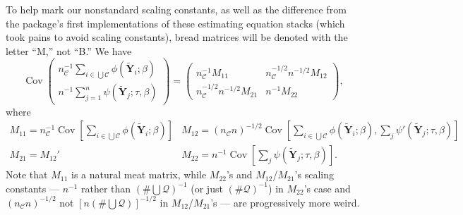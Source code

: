 \documentclass{article}
\begin{document}
To help mark our nonstandard scaling constants, as well as the difference from the package's first implementations of these estimating equation stacks (which took pains to avoid scaling constants), 
bread matrices will be denoted with the letter ``M,'' not ``B.''
We have
\[
\operatorname{Cov}\left(
     \begin{array}{c}
       n_{\mathcal{C}}^{-1}\sum_{i\in \bigcup \mathcal{C}}\phi(\tilde{\mathbf{Y}}_{i}; \beta )\\
       n^{-1}\sum_{j=1}^{n}\psi(\tilde{\mathbf{Y}}_{j}; \tau, \beta )
     \end{array}
\right) = \left(
  \begin{array}{cc}
    n_{\mathcal{C}}^{-1}M_{11}& n_{\mathcal{C}}^{-1/2}n^{-1/2} M_{12}\\
    n_{\mathcal{C}}^{-1/2}n^{-1/2} M_{21} & n^{-1}M_{22}
  \end{array}
\right),
\]
where
\[
  \begin{array}{cc}
    M_{11}  = n_{\mathcal{C}}^{-1}\operatorname{Cov}[\sum_{i\in \bigcup
             \mathcal{C}} \phi(\tilde{\mathbf{Y}}_{i}; \beta )] &
                                                                  M_{12}=
                                                                  (n_{\mathcal{C}}n)^{-1/2} \operatorname{Cov}[\sum_{i\in \bigcup
             \mathcal{C}}\phi(\tilde{\mathbf{Y}}_{i};
                                                                  \beta
                                                                  ), \sum_{j}\psi'(\tilde{\mathbf{Y}}_{j}; \tau, \beta )]\\
    M_{21}=M_{12}' & M_{22} = n^{-1}\operatorname{Cov}[\sum_{j}\psi(\tilde{\mathbf{Y}}_{j};
                     \tau, \beta )] .
    \end{array}
\]
Note that $M_{11}$ is a natural meat matrix, while $M_{22}$'s and
$M_{12}$/$M_{21}$'s scaling constants --- $n^{-1}$ rather than $(\# \bigcup
\mathcal{Q})^{-1}$ (or just $(\# \mathcal{Q})^{-1}$) in $M_{22}$'s
case and $(n_{\mathcal{C}}n)^{-1/2}$ not $[n (\# \bigcup
\mathcal{Q})]^{-1/2}$ in $M_{12}$/$M_{21}$'s --- are progressively more weird.
\end{document}
